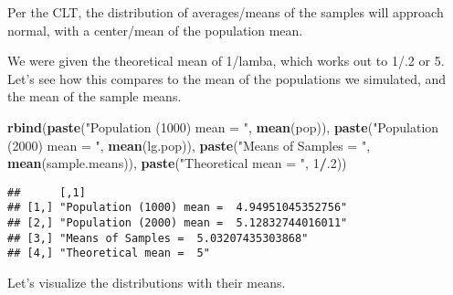 \documentclass[]{article}
\newenvironment{Shaded}{\begin{snugshade}}{\end{snugshade}}
\newcommand{\KeywordTok}[1]{\textcolor[rgb]{0.13,0.29,0.53}{\textbf{#1}}}
\newcommand{\DecValTok}[1]{\textcolor[rgb]{0.00,0.00,0.81}{#1}}
\newcommand{\StringTok}[1]{\textcolor[rgb]{0.31,0.60,0.02}{#1}}
\newcommand{\OperatorTok}[1]{\textcolor[rgb]{0.81,0.36,0.00}{\textbf{#1}}}
\newcommand{\NormalTok}[1]{#1}
\begin{document}
Per the CLT, the distribution of averages/means of the samples will
approach normal, with a center/mean of the population mean.

We were given the theoretical mean of 1/lamba, which works out to 1/.2
or 5. Let's see how this compares to the mean of the populations we
simulated, and the mean of the sample means.

\begin{Shaded}
\begin{Highlighting}[]
\KeywordTok{rbind}\NormalTok{(}\KeywordTok{paste}\NormalTok{(}\StringTok{"Population (1000) mean = "}\NormalTok{, }\KeywordTok{mean}\NormalTok{(pop)),}
      \KeywordTok{paste}\NormalTok{(}\StringTok{"Population (2000) mean = "}\NormalTok{, }\KeywordTok{mean}\NormalTok{(lg.pop)),}
      \KeywordTok{paste}\NormalTok{(}\StringTok{"Means of Samples = "}\NormalTok{, }\KeywordTok{mean}\NormalTok{(sample.means)),}
      \KeywordTok{paste}\NormalTok{(}\StringTok{"Theoretical mean = "}\NormalTok{, }\DecValTok{1}\OperatorTok{/}\NormalTok{.}\DecValTok{2}\NormalTok{))}
\end{Highlighting}
\end{Shaded}

\begin{verbatim}
##      [,1]                                        
## [1,] "Population (1000) mean =  4.94951045352756"
## [2,] "Population (2000) mean =  5.12832744016011"
## [3,] "Means of Samples =  5.03207435303868"      
## [4,] "Theoretical mean =  5"
\end{verbatim}

Let's visualize the distributions with their means.
\end{document}
